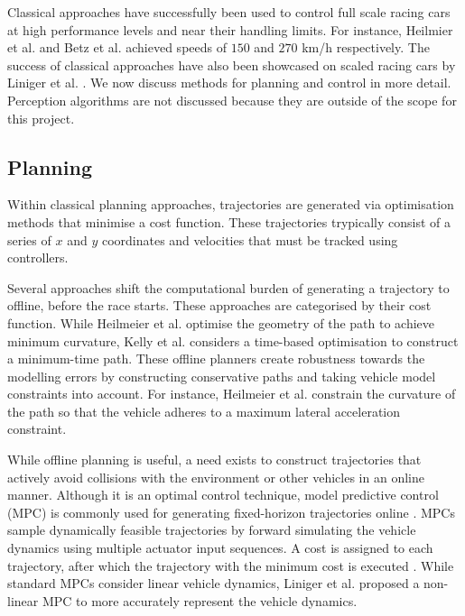 Classical approaches have successfully been used to control full scale racing cars \cite{Valls2018, alvarez2022, Nekkah2020} at high performance levels and near their handling limits.
For instance, Heilmier et al. \cite{Heilmeier2020} and
Betz et al. \cite{Betz_2023} achieved speeds of $150$ and $270$ km/h respectively.
The success of classical approaches have also been showcased on scaled racing cars by Liniger et al. \cite{Liniger2015}.
We now discuss methods for planning and control in more detail.
Perception algorithms are not discussed because they are outside of the scope for this project.

\subsection{Planning}\label{sec:trajectory_planning}
Within classical planning approaches, trajectories are generated via optimisation methods that minimise a cost function.
These trajectories trypically consist of a series of $x$ and $y$ coordinates and velocities that must be tracked using controllers.

Several approaches \cite{Heilmeier2020, Kelly2010, Herrmann2019} shift the computational burden of generating a trajectory to offline, before the race starts.
These approaches are categorised by their cost function.
While Heilmeier et al. \cite{Heilmeier2020} optimise the geometry of the path to achieve minimum curvature, Kelly et al. \cite{Kelly2010} considers a time-based optimisation to construct a minimum-time path.
These offline planners create robustness towards the modelling errors by constructing conservative paths and taking vehicle model constraints into account.
For instance, Heilmeier et al. \cite{Heilmeier2020} constrain the curvature of the path so that the vehicle adheres to a maximum lateral acceleration constraint.

While offline planning is useful, a need exists to construct trajectories that actively avoid collisions with the environment or other vehicles in an online manner.
Although it is an optimal control technique, model predictive control (MPC) is commonly used for generating fixed-horizon trajectories online \cite{Liniger2015a, Liniger2015, Anderson2016, Funke2017}.
MPCs sample dynamically feasible trajectories by forward simulating the vehicle dynamics using multiple actuator input sequences.
A cost is assigned to each trajectory, after which the trajectory with the minimum cost is executed \cite{Betz2021}. 
While standard MPCs consider linear vehicle dynamics, Liniger et al. \cite{Liniger2015} proposed a non-linear MPC to more accurately represent the vehicle dynamics.

